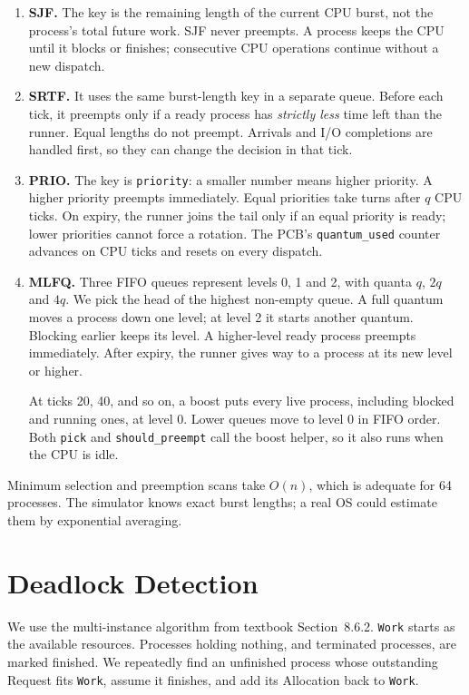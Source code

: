 \documentclass[11pt,a4paper,twocolumn]{article}
\newcommand{\code}[1]{\texttt{#1}}
\begin{document}
\begin{enumerate}
\item \textbf{SJF.} The key is the remaining length of the current CPU
burst, not the process's total future work. SJF never preempts. A process
keeps the CPU until it blocks or finishes; consecutive CPU operations
continue without a new dispatch.

\item \textbf{SRTF.} It uses the same burst-length key in a separate
queue. Before each tick, it preempts only if a ready process has
\emph{strictly less} time left than the runner. Equal lengths do not
preempt. Arrivals and I/O completions are handled first, so they can
change the decision in that tick.

\item \textbf{PRIO.} The key is \code{priority}: a smaller number means
higher priority. A higher priority preempts immediately. Equal
priorities take turns after \(q\) CPU ticks. On expiry, the runner joins
the tail only if an equal priority is ready; lower priorities cannot
force a rotation. The PCB's \code{quantum\_used} counter advances on CPU
ticks and resets on every dispatch.

\item \textbf{MLFQ.} Three FIFO queues represent levels 0, 1 and 2,
with quanta \(q\), \(2q\) and \(4q\). We pick the head of the highest
non-empty queue. A full quantum moves a process down one level; at
level 2 it starts another quantum. Blocking earlier keeps its level.
A higher-level ready process preempts immediately. After expiry, the
runner gives way to a process at its new level or higher.

At ticks 20, 40, and so on, a boost puts every live process, including
blocked and running ones, at level 0. Lower queues move to level 0 in
FIFO order. Both \code{pick} and \code{should\_preempt} call the boost
helper, so it also runs when the CPU is idle.
\end{enumerate}

Minimum selection and preemption scans take \(O(n)\), which is adequate
for 64 processes. The simulator knows exact burst lengths; a real OS
could estimate them by exponential averaging.

\section{Deadlock Detection}

We use the multi-instance algorithm from textbook Section~8.6.2.
\code{Work} starts as the available resources. Processes holding nothing,
and terminated processes, are marked finished. We repeatedly find an
unfinished process whose outstanding Request fits \code{Work}, assume
it finishes, and add its Allocation back to \code{Work}.
\end{document}
